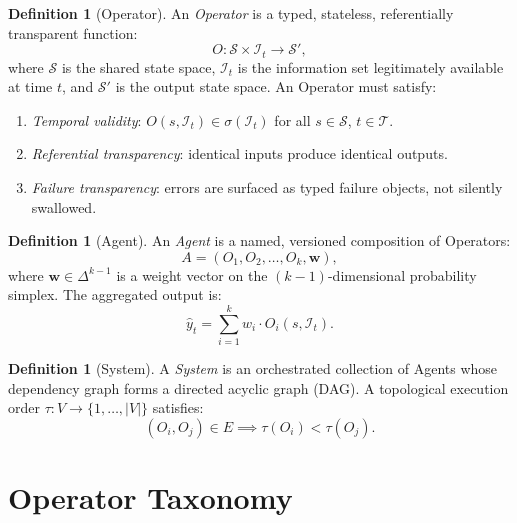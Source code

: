 \documentclass[12pt,openany]{book}
\numberwithin{equation}{chapter}
\theoremstyle{plain}
\theoremstyle{definition}
\newtheorem{definition}[theorem]{Definition}
\theoremstyle{remark}
\begin{document}
\begin{definition}[Operator]
An \emph{Operator} is a typed, stateless, referentially transparent function:
\begin{equation}
    O : \mathcal{S} \times \mathcal{I}_t \rightarrow \mathcal{S}',
\end{equation}
where $\mathcal{S}$ is the shared state space, $\mathcal{I}_t$ is the
information set legitimately available at time $t$, and $\mathcal{S}'$ is
the output state space. An Operator must satisfy:
\begin{enumerate}
    \item \emph{Temporal validity}: $O(s, \mathcal{I}_t) \in \sigma(\mathcal{I}_t)$
          for all $s \in \mathcal{S}$, $t \in \mathcal{T}$.
    \item \emph{Referential transparency}: identical inputs produce identical outputs.
    \item \emph{Failure transparency}: errors are surfaced as typed failure objects,
          not silently swallowed.
\end{enumerate}
\end{definition}

\begin{definition}[Agent]
An \emph{Agent} is a named, versioned composition of Operators:
\begin{equation}
    A = (O_1, O_2, \ldots, O_k, \mathbf{w}),
\end{equation}
where $\mathbf{w} \in \Delta^{k-1}$ is a weight vector on the $(k-1)$-dimensional
probability simplex. The aggregated output is:
\begin{equation}
    \hat{y}_t = \sum_{i=1}^{k} w_i \cdot O_i(s, \mathcal{I}_t).
\end{equation}
\end{definition}

\begin{definition}[System]
A \emph{System} is an orchestrated collection of Agents whose dependency
graph forms a directed acyclic graph (DAG). A topological execution order
$\tau : V \rightarrow \{1, \ldots, |V|\}$ satisfies:
\begin{equation}
    (O_i, O_j) \in E \implies \tau(O_i) < \tau(O_j).
\end{equation}
\end{definition}

\section{Operator Taxonomy}
\end{document}
